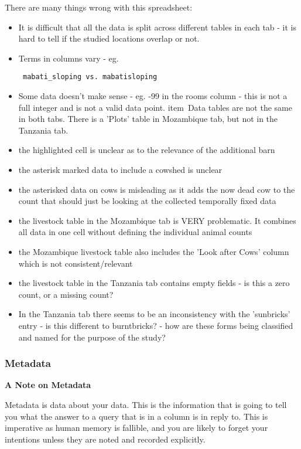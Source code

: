\documentclass{article}
\begin{document}
There are many things wrong with this spreadsheet:
\begin{itemize}
    \item It is difficult that all the data is split across different tables in each tab - it is hard to tell if the studied locations overlap or not. 
    \item Terms in columns vary - eg. \begin{verbatim} mabati_sloping vs. mabatisloping
    \end{verbatim}
    \item Some data doesn't make sense - eg. -99 in the rooms column - this is not a full integer and is not a valid data point. 
    item\ Data tables are not the same in both tabs. There is a 'Plots' table in Mozambique tab, but not in the Tanzania tab.
    \item the highlighted cell is unclear as to the relevance of the additional barn
    \item the asterisk marked data to include a cowshed is unclear
    \item the asterisked data on cows is misleading as it adds the now dead cow to the count that should just be looking at the collected temporally fixed data
    \item the livestock table in the Mozambique tab is VERY problematic. It combines all data in one cell without defining the individual animal counts
    \item the Mozambique livestock table also includes the 'Look after Cows' column which is not consistent/relevant
    \item the livestock table in the Tanzania tab contains empty fields - is this a zero count, or a missing count?
    \item In the Tanzania tab there seems to be an inconsistency with the 'sunbricks' entry - is this different to burntbricks? - how are these forms being classified and named for the purpose of the study?
    \end{itemize}

\subsubsection{Metadata}
\textbf{A Note on Metadata}

Metadata is data about your data. This is the information that is going to tell you what the answer to a query that is in a column is in reply to. This is imperative as human memory is fallible, and you are likely to forget your intentions unless they are noted and recorded explicitly. 
\end{document}
